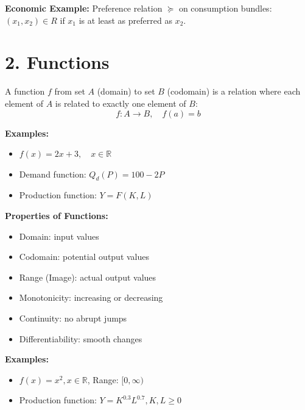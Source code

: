 \begin{tcolorbox}[examplebox]
\textbf{Economic Example:} Preference relation $\succeq$ on consumption bundles: $(x_1,x_2) \in R$ if $x_1$ is at least as preferred as $x_2$.
\end{tcolorbox}

\section*{2. Functions}

\begin{tcolorbox}[sectionbox]
A function $f$ from set $A$ (domain) to set $B$ (codomain) is a relation where each element of $A$ is related to exactly one element of $B$:
\[
f: A \to B, \quad f(a) = b
\]
\end{tcolorbox}

\begin{tcolorbox}[examplebox]
\textbf{Examples:}
\begin{itemize}
    \item $f(x) = 2x + 3, \quad x \in \mathbb{R}$
    \item Demand function: $Q_d(P) = 100 - 2P$
    \item Production function: $Y = F(K,L)$
\end{itemize}
\end{tcolorbox}


\begin{tcolorbox}[sectionbox]
\textbf{Properties of Functions:}
\begin{itemize}
    \item Domain: input values
    \item Codomain: potential output values
    \item Range (Image): actual output values
    \item Monotonicity: increasing or decreasing
    \item Continuity: no abrupt jumps
    \item Differentiability: smooth changes
\end{itemize}
\end{tcolorbox}

\begin{tcolorbox}[examplebox]
\textbf{Examples:}
\begin{itemize}
    \item $f(x) = x^2, x \in \mathbb{R}$, Range: $[0,\infty)$
    \item Production function: $Y = K^{0.3} L^{0.7}, K,L \ge 0$
\end{itemize}
\end{tcolorbox}

